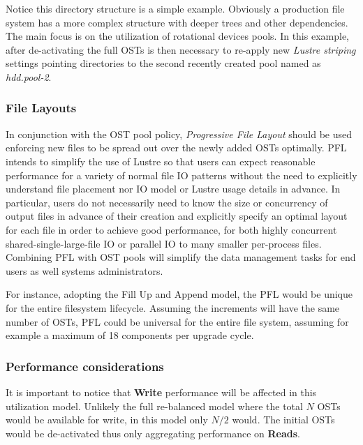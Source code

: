\documentclass{article}
\begin{document}
Notice this directory structure is a simple example. Obviously a production file system has a more complex structure with deeper trees and other dependencies. The main focus is on the utilization of rotational devices pools. In this example, after de-activating the full OSTs is then necessary to re-apply new \textit{Lustre striping} settings pointing directories to the second recently created pool named as \textit{hdd.pool-2}. 

\subsubsection{File Layouts}
In conjunction with the OST pool policy, \textit{Progressive File Layout} should be used enforcing new files to be spread out over the newly added OSTs optimally. PFL intends to simplify the use of Lustre so that users can expect reasonable performance for a variety of normal file IO patterns without the need to explicitly understand file placement nor IO model or Lustre usage details in advance. In particular, users do not necessarily need to know the size or concurrency of output files in advance of their creation and explicitly specify an optimal layout for each file in order to achieve good performance, for both highly concurrent shared-single-large-file IO or parallel IO to many smaller per-process files. Combining PFL with OST pools will simplify the data management tasks for end users as well systems administrators. 

For instance, adopting the Fill Up and Append model, the PFL would be unique for the entire filesystem lifecycle. Assuming the increments will have the same number of OSTs, PFL could be universal for the entire file system, assuming for example a maximum of 18 components per upgrade cycle. 


\subsubsection{Performance considerations}
It is important to notice that \textbf{Write} performance will be affected in this utilization model. Unlikely the full re-balanced model where the total $N$ OSTs would be available for write, in this model only $N/2$ would. The initial OSTs would be de-activated thus only aggregating performance on \textbf{Reads}. 
\end{document}
